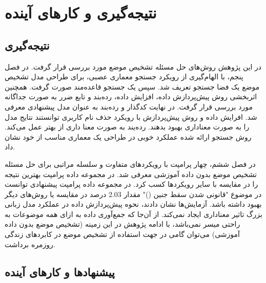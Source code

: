 \chapter{نتیجه‌گیری و کارهای آینده}
\thispagestyle{empty}

\section{نتیجه‌گیری}
در این پژوهش روش‌های حل مسئله تشخیص موضع مورد بررسی قرار گرفت. در فصل پنجم، با الهام‌گیری از رویکرد جستجو معماری عصبی، برای طراحی مدل تشخیص موضع یک فضا جستجو تعریف شد. سپس یک جستجو قاعده‌مند صورت گرفت. همچنین اثربخشی روش پیش‌پردازش داده، افزایش داده، رده‌بند و تابع ضرر به صورت جداگانه مورد بررسی قرار گرفت. در نهایت کدگذار
و رده‌بند
به عنوان مدل پیشنهادی معرفی شد. افرایش داده و روش پیش‌پردازش با رویکرد حذف نام کاربری توانستند نتایج مدل را به صورت معناداری بهبود بدهند. رده‌یند
به صورت معنا داری از 
بهتر عمل می‌کند. روش جستجو ارائه شده عملکرد خوبی در طراحی یک معماری مناسب از خود نشان داد. 

در فصل ششم، چهار پرامپت با رویکردهای متفاوت و سلسله مراتبی برای حل مسئله تشخیص موضع بدون داده‌ آموزشی معرفی شد. در مجموعه داده
پرامپت
بهترین نتیجه را در مقایسه با سایر رویکردها کسب کرد. در مجموعه داده 
پرامپت
پیشنهادی توانست در موضوع "قانونی شدن سقط جنین ()" مقدار
$ 2.03 $
 درصد در مقایسه یا روش‌های دیگر
بهبود داشته باشد. آزمایش‌ها نشان دادند، نحوه پیش‌پردازش داده در عملکرد مدل زبانی بزرگ تاثیر معناداری ایجاد نمی‌کند. از آن‌جا که جمع‌آوری داده به ازای همه موضوعات به راحتی میسر نمی‌باشد، با ادامه پژوهش در این زمینه (تشخیص موضع بدون داده‌ آموزشی) می‌توان گامی در جهت استفاده از تشخیص موضع در کابردهای زندگی روزمره برداشت.
 
\section{پیشنهادها و کار‌های آینده}

